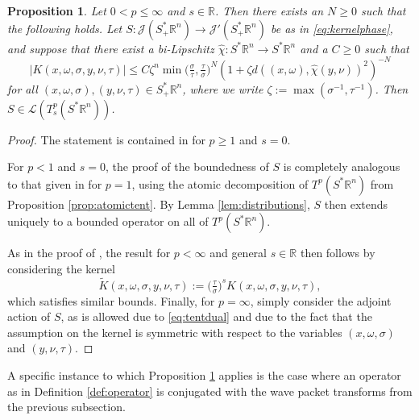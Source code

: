 \documentclass{amsart}
\newcommand {\J}{\mathcal{J}}
\newcommand {\La}{\mathcal{L}}
\newcommand {\R}{\mathbb R}
\newcommand {\Rn}{\mathbb{R}^{n}}
\newcommand {\Sp}{S^{*}\Rn}
\newcommand {\Spp}{S^{*}_{+}\Rn}
\newcommand {\w}{\omega}
\newcommand {\wt}{\widetilde}
\newtheorem{proposition}[theorem]{Proposition}
\theoremstyle{definition}
\newtheorem{remark}[theorem]{Remark}
\numberwithin{equation}{section}
\begin{document}
\begin{proposition}\label{prop:offsing}
Let $0<p\leq \infty$ and $s\in\R$. Then there exists an $N\geq0$ such that the following holds. Let $S:\J(\Spp)\to\J'(\Spp)$ be as in \eqref{eq:kernelphase}, and suppose that there exist a bi-Lipschitz $\hat{\chi}:\Sp\to\Sp$ and a $C\geq0$ such that
\[
|K(x,\w,\sigma,y,\nu,\tau)|\leq C\zeta^{n}\min\big(\tfrac{\sigma}{\tau},\tfrac{\tau}{\sigma}\big)^{N}(1+\zeta d((x,\w),\hat{\chi}(y,\nu))^{2})^{-N}
\]
for all $(x,\w,\sigma),(y,\nu,\tau)\in\Spp$, where we write $\zeta:=\max(\sigma^{-1},\tau^{-1})$.
Then $S\in\La(T^{p}_{s}(\Sp))$. 
\end{proposition}
\begin{proof}
The statement is contained in \cite[Theorem 3.7]{HaPoRo20} for $p\geq1$ and $s=0$. %

For $p<1$ and $s=0$, the proof of the boundedness of $S$ is completely analogous to that given in \cite[Theorem 3.7]{HaPoRo20} for $p=1$, using the atomic decomposition of $T^{p}(\Sp)$ from Proposition \ref{prop:atomictent}. By Lemma \ref{lem:distributions}, $S$ then extends uniquely to a bounded operator on all of $T^{p}(\Sp)$. 

As in the proof of \cite[Proposition 2.4]{Hassell-Rozendaal23}, the result for $p<\infty$ and general $s\in\R$ then follows by considering the kernel 
\[
\wt{K}(x,\w,\sigma,y,\nu,\tau):=\big(\tfrac{\tau}{\sigma}\big)^{s}K(x,\w,\sigma,y,\nu,\tau),
\]
which satisfies similar bounds. Finally, for $p=\infty$, %
simply consider the adjoint action of $S$, as is allowed due to \eqref{eq:tentdual} and due to the fact that the assumption on the kernel is symmetric with respect to the variables $(x,\w,\sigma)$ and $(y,\nu,\tau)$.
\end{proof}




A specific instance to which Proposition \ref{prop:offsing} applies is the case where an operator as in Definition \ref{def:operator} is conjugated with the wave packet transforms from the previous subsection.
\end{document}
